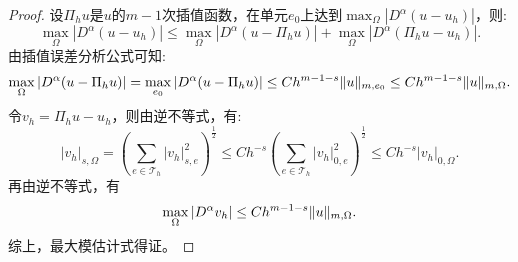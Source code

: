 \begin{proof}
    设$\Pi_{h}u$是$u$的$m-1$次插值函数，在单元$e_{0}$上达到$\max_{\Omega}|D^{\alpha}(u-u_{h})|$，则:
    \begin{equation}
        \max_{\Omega}|D^{\alpha}(u-u_{h})|\le\max_{\Omega}|D^{\alpha}(u-\Pi_{h}u)|+\max_{\Omega}|D^{\alpha}(\Pi_{h}u-u_{h})|.
    \end{equation}
    由插值误差分析公式可知:
    \begin{equation}
        \max_{\Omega}|D^{\alpha}(u-\Pi_{h}u)|=\max_{e_{0}}|D^{\alpha}(u-\Pi_{h}u)|\le Ch^{m-1-s}\|u\|_{m,e_{0}}\le Ch^{m-1-s}\|u\|_{m,\Omega}.
    \end{equation}
    令$v_{h}=\Pi_{h}u-u_{h}$，则由逆不等式，有:
    \begin{equation}
        |v_{h}|_{s,\Omega}=\left(\sum_{e\in\mathcal{T}_{h}}|v_{h}|_{s,e}^{2}\right)^{\frac{1}{2}}\le Ch^{-s}\left(\sum_{e\in\mathcal{T}_{h}}|v_{h}|_{0,e}^{2}\right)^{\frac{1}{2}}\le Ch^{-s}|v_{h}|_{0,\Omega}.
    \end{equation}
    再由逆不等式，有
    \begin{equation}
        \max_{\Omega}|D^{\alpha}v_{h}|\le Ch^{m-1-s}\|u\|_{m,\Omega}.
    \end{equation}
    综上，最大模估计式得证。
\end{proof}